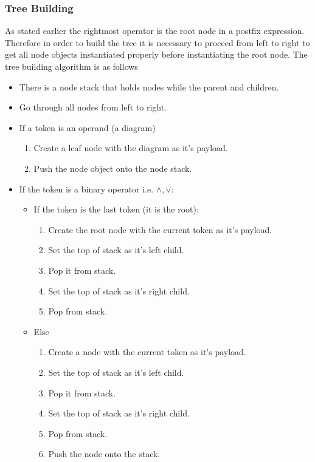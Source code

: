 \documentclass[10pt, a4paper, titlepage]{article}
\begin{document}
\subsubsection{Tree Building}
As stated earlier the rightmost operator is the root node in a postfix expression. Therefore in order to build the tree it is necessary to proceed from left to right to get all node objects instantiated properly before instantiating the root node. The tree building algorithm is as follows
\begin{itemize}
\item There is a node stack that holds nodes while  the parent and children.
\item Go through all nodes from left to right.
\item If a token is an operand (a diagram) 
\begin{enumerate}
\item Create a leaf node with the diagram as it's payload.
\item Push the node object onto the node stack.
\end{enumerate}

\item If the token is a binary operator i.e. $ \wedge , \vee $:
\begin{itemize}
\item If the token is the last token (it is the root):
\begin{enumerate}
\item Create the root node with the current token as it's payload.
\item Set the top of stack as it's left child.
\item Pop it from stack.
\item Set the top of stack as it's right child.
\item Pop from stack.
\end{enumerate}

\item Else
\begin{enumerate}
\item Create a node with the current token as it's payload.
\item Set the top of stack as it's left child.
\item Pop it from stack.
\item Set the top of stack as it's right child.
\item Pop from stack.
\item Push the node onto the stack.
\end{enumerate}


\end{itemize}
\end{itemize}
\end{document}
